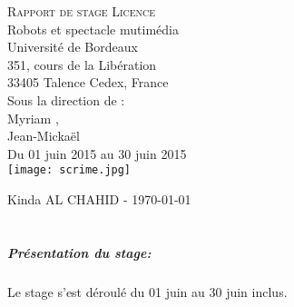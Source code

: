 \documentclass[10pt,a4paper]{report}
\begin{document}
\begin{titlepage} 
\begin{center}

        \textsc{\Huge Rapport de stage Licence}\\[1cm]
        {\huge Robots et spectacle mutimédia}\\[1cm]
        {\Large Université de Bordeaux \\ 
351, cours de la Libération\\ 33405 Talence Cedex, France}\\[1cm]
        {\Large Sous la direction de : \\}
        {\Large Myriam ,\\
         Jean-Mickaël }\\[1cm]
         {\Large Du 01 juin 2015 au 30 juin 2015\\}
    		\texttt{[image: scrime.jpg]} 	
 
\end{center}

    \begin{flushbottom}
        \begin{flushleft}
            \large Kinda \textsc{AL CHAHID} - \today \\
        \end{flushleft}
    \end{flushbottom}

\end{titlepage}




\tableofcontents
{}

\printglossary[type=\acronymtype]




\chapter*{}
\paragraph{Présentation du stage:}
\paragraph{}
Le stage s'est déroulé du 01 juin au 30 juin inclus.
\end{document}

